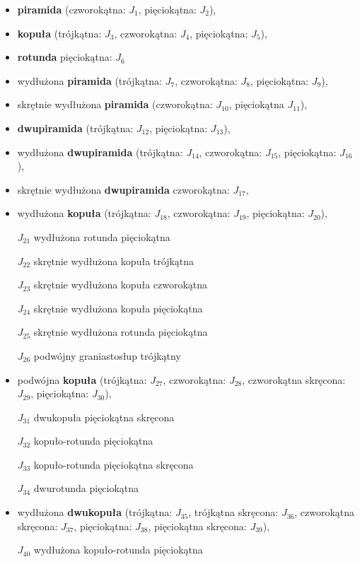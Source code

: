 \begin{itemize}
    \item \textbf{piramida} (czworokątna: $J_1$, pięciokątna: $J_2$),
    \item \textbf{kopuła} (trójkątna: $J_3$, czworokątna: $J_4$, pięciokątna: $J_5$),
    \item \textbf{rotunda} pięciokątna: $J_6$
    \item wydłużona \textbf{piramida} (trójkątna: $J_7$, czworokątna: $J_8$, pięciokątna: $J_9$),
    \item skrętnie wydłużona \textbf{piramida} (czworokątna: $J_{10}$, pięciokątna $J_{11}$),
    \item \textbf{dwupiramida} (trójkątna: $J_{12}$, pięciokątna: $J_{13
    }$),
    \item wydłużona \textbf{dwupiramida} (trójkątna: $J_{14}$, czworokątna: $J_{15}$, pięciokątna: $J_{16}$),
    \item skrętnie wydłużona \textbf{dwupiramida} czworokątna: $J_{17}$,
    \item wydłużona \textbf{kopuła} (trójkątna: $J_{18}$, czworokątna: $J_{19}$, pięciokątna: $J_{20}$),
    \item [$J_{21}$] {wydłużona rotunda pięciokątna}
    \item [$J_{22}$] {skrętnie wydłużona kopuła trójkątna}
    \item [$J_{23}$] {skrętnie wydłużona kopuła czworokątna}
    \item [$J_{24}$] {skrętnie wydłużona kopuła pięciokątna}
    \item [$J_{25}$] {skrętnie wydłużona rotunda pięciokątna}
    \item [$J_{26}$] {podwójny graniastosłup trójkątny}
    \item podwójna \textbf{kopuła} (trójkątna: $J_{27}$, czworokątna: $J_{28}$, czworokątna skręcona: $J_{29}$, pięciokątna: $J_{30}$),
    \item [$J_{31}$] {dwukopuła pięciokątna skręcona}
    \item [$J_{32}$] {kopuło-rotunda pięciokątna}
    \item [$J_{33}$] {kopuło-rotunda pięciokątna skręcona}
    \item [$J_{34}$] {dwurotunda pięciokątna}
    \item wydłużona \textbf{dwukopuła} (trójkątna: $J_{35}$, trójkątna skręcona: $J_{36}$, czworokątna skręcona: $J_{37}$, pięciokątna: $J_{38}$, pięciokątna skręcona: $J_{39}$),
    \item [$J_{40}$] {wydłużona kopuło-rotunda pięciokątna}

\end{itemize}
